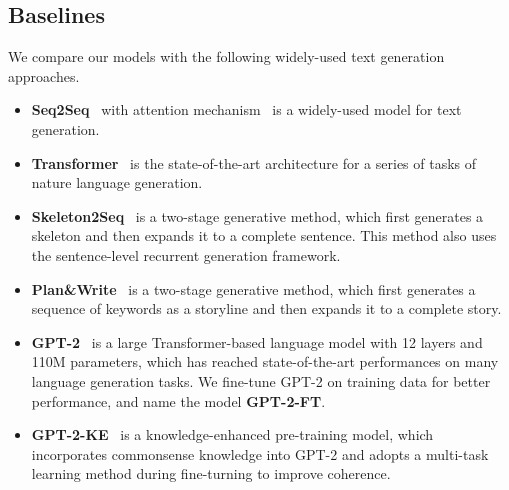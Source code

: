 \documentclass[letterpaper]{article} %
\begin{document}
\subsection{Baselines}
We compare our models with the following widely-used text generation approaches.
\begin{itemize}
\item \textbf{Seq2Seq}~\cite{sutskever-et-al:seq2seq} with attention mechanism~\cite{bahdanau-et-al:attention} is a widely-used model for text generation.
\item \textbf{Transformer}~\cite{vaswani-et-al:transformer} is the state-of-the-art architecture for 
a series of tasks of nature language generation. 
\item \textbf{Skeleton2Seq}~\cite{xu-et-al:skeleton_jingjingxu_emnlp8} is a two-stage generative method, which first generates a skeleton and then expands it to a complete sentence. This method also uses the sentence-level recurrent generation framework.
\item \textbf{Plan\&Write}~\cite{plan-and-write} is a two-stage generative method, which first generates a sequence of keywords as a storyline and then expands it to a complete story.

\item \textbf{GPT-2}~\cite{radford-et-al:gpt2} is a large Transformer-based language model with 12 layers and  110M parameters, which has reached state-of-the-art performances on many language generation tasks. We fine-tune GPT-2 on training data for better performance, and name the model \textbf{GPT-2-FT}.

\item \textbf{GPT-2-KE}~\cite{gpt2-ke} is a knowledge-enhanced pre-training model, which incorporates commonsense knowledge  into GPT-2  and adopts a multi-task learning method during fine-turning  to improve coherence.
\end{itemize}
\end{document}
